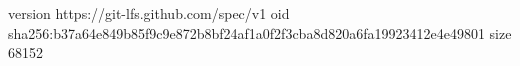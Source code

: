 version https://git-lfs.github.com/spec/v1
oid sha256:b37a64e849b85f9c9e872b8bf24af1a0f2f3cba8d820a6fa19923412e4e49801
size 68152
